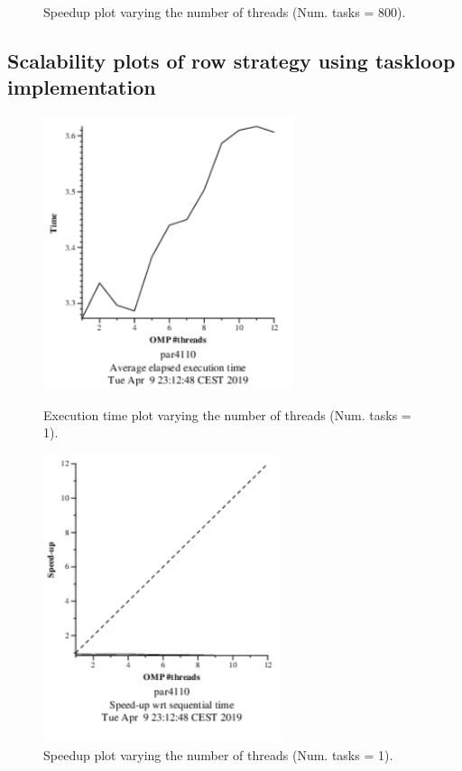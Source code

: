 \documentclass[12pt, a4paper]{article}
\begin{document}
\begin{figure}[H]
\begin{minipage}[b]{0.4\linewidth}
  \caption{Speedup plot varying the number of threads (Num. tasks = 800).}
  \label{fig:mandel-omp-10000-strong-omp-24-800-speedup}
\end{minipage}
\end{figure}






\subsection{Scalability plots of row strategy using taskloop implementation}
\label{sec:row_taskloop_scalability_plots}

\begin{figure}[H]
\centering
\begin{minipage}[t]{0.4\linewidth}
  \centering
  \includegraphics[scale=1.5]{./mandel-omp-10000-strong-omp-3-1-time}
  \caption{Execution time plot varying the number of threads (Num. tasks = 1).}
  \label{fig:mandel-omp-10000-strong-omp-3-1-time}
\end{minipage}%
\hspace{0.5cm}
\begin{minipage}[t]{0.4\linewidth}
  \centering
  \includegraphics[scale=1.5]{./mandel-omp-10000-strong-omp-3-1-speedup}
  \caption{Speedup plot varying the number of threads (Num. tasks = 1).}
  \label{fig:mandel-omp-10000-strong-omp-3-1-speedup}
\end{minipage}
\end{figure}
\end{document}
